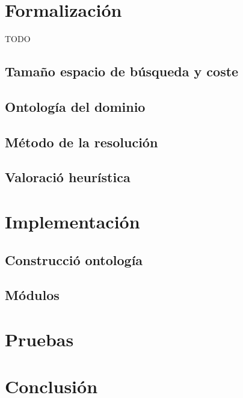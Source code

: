 \documentclass[11pt]{article}
\begin{document}
\newpage
\section{Formalización} TODO

\subsection{Tamaño espacio de búsqueda y coste}

\subsection{Ontología del dominio}

\subsection{Método de la resolución}

\subsection{Valoració heurística}

\newpage
\section{Implementación}

\subsection{Construcció ontología}

\subsection{Módulos}

\newpage
\section{Pruebas}

\section{Conclusión}
\end{document}
